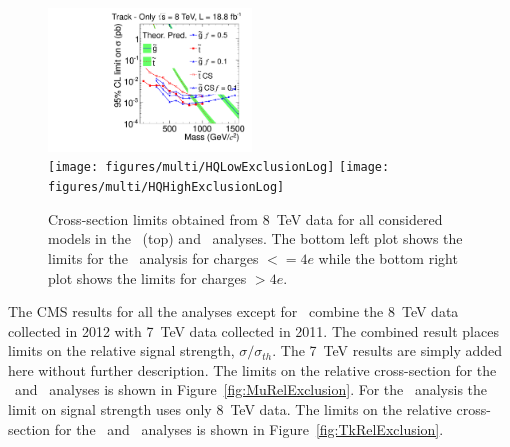 \begin{figure}
\centering
  \includegraphics[clip=false, trim=0.0cm 0cm 0.0cm 0cm, width=0.48\textwidth]{figures/tkonly/TkExclusionLog} \\
  \texttt{[image: figures/multi/HQLowExclusionLog]}
  \texttt{[image: figures/multi/HQHighExclusionLog]}
\caption[Cross-section limits obtained from 8~TeV data for all considered models in the \tkonly\ and \multi\ analyses]
{Cross-section limits obtained from 8~TeV data for all considered models in the \tkonly\ (top) and \multi\ analyses.
The bottom left plot shows the limits for the \multi\ analysis for charges $<= 4e$ while the bottom right plot shows the limits for charges $> 4e$.
}
    \label{fig:TkExclusion}
\end{figure}

The CMS results for all the analyses except for \muononly\ combine the 8~TeV data collected in 2012 with 7~TeV data collected in 2011.
The combined result places limits on
the relative signal strength, $\sigma/\sigma_{th}$. The 7~TeV results are simply added here without further description.
The limits on the relative cross-section
for the \muononly\ and \tktof\ analyses is shown in Figure~\ref{fig:MuRelExclusion}. For the \muononly\ analysis the limit on signal strength uses only 8~TeV data.
The limits on the relative cross-section for the \tkonly\ and \multi\ analyses is shown in Figure~\ref{fig:TkRelExclusion}.

